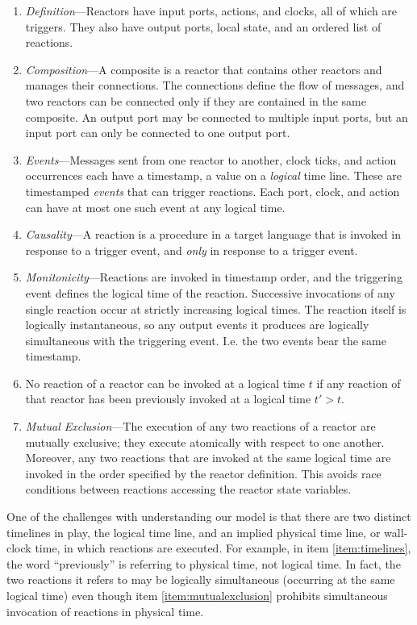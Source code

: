 \documentclass[sigconf]{acmart}
\newcommand{\marten}[1]{\mynote{Marten}{#1}{cyan}}%
\begin{document}
\begin{enumerate}

	\item \emph{Definition}---Reactors have input ports, actions, and clocks, all of which are triggers.
	They also have output ports, local state, and an ordered list of reactions.
	\item \emph{Composition}---A composite is a reactor that contains other reactors and manages their connections.
	The connections define the flow of messages,
	and two reactors can be connected only if they are contained in the same composite.
	An output port may be connected to multiple input ports, but an input port can only be connected to one output port.
	\item \emph{Events}---Messages sent from one reactor to another, clock ticks, and action occurrences each have a timestamp,
	a value on a \emph{logical} time line. These are timestamped \emph{events} that can trigger reactions.
	Each port, clock, and action can have at most one such event at any logical time.
	\item \emph{Causality}---A reaction is a procedure in a target language that is invoked in response to a trigger event,
	and \emph{only} in response to a trigger event. 
	\item \emph{Monitonicity}---Reactions are invoked in timestamp order, and the triggering event defines the logical time of the reaction.
	Successive invocations of any single reaction occur at strictly increasing logical times.
	The reaction itself is logically instantaneous, so any output events it produces are logically simultaneous
	with the triggering event.
	I.e. the two events bear the same timestamp.
	\item \label{item:timelines} \marten{Redundant?}
	No reaction of a reactor can be invoked at a logical time $t$ if any reaction of that reactor
	has been previously invoked at 	a logical time $t' > t$.
	\item \label{item:mutualexclusion}\emph{Mutual Exclusion}---The execution of any two reactions of a reactor 
	are mutually exclusive;
	they execute atomically with respect to one another.
	Moreover, any two reactions that are invoked at the same logical time are
	invoked in the order specified by the reactor definition.
	This avoids race conditions between reactions accessing the reactor state variables. 
\end{enumerate}
One of the challenges with understanding our model is that there are two distinct timelines in play,
the logical time line, and an implied physical time line, or wall-clock time, in which reactions are executed.
For example, in item \ref{item:timelines}, the word ``previously'' is referring to physical time, not logical time.
In fact, the two reactions it refers to may be logically simultaneous (occurring at the same logical time)
even though item \ref{item:mutualexclusion} prohibits simultaneous invocation of reactions in physical time.
\end{document}
